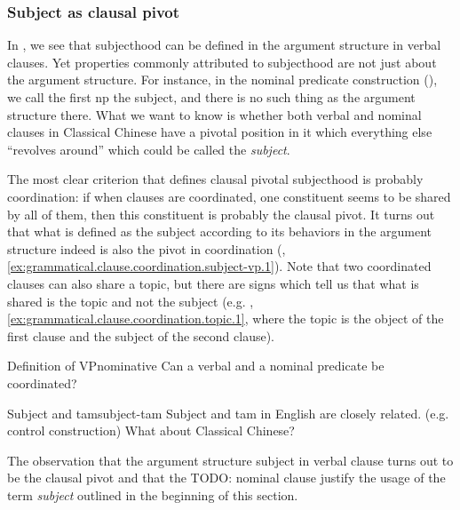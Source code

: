 \documentclass[UTF8, a4paper, oneside, scheme=plain, 12pt]{ctexrep}
\newcommand*{\term}[1]{\emph{#1}}
\begin{document}
\subsubsection{Subject as clausal pivot}\label{sec:grammatical.verbal.subject.clause-pivot}

In ,
we see that subjecthood can be defined in the argument structure in verbal clauses.
Yet properties commonly attributed to subjecthood are not just about the argument structure.
For instance, in the nominal predicate construction (),
we call the first \ac{np} the subject,
and there is no such thing as the argument structure there.
What we want to know is whether both verbal and nominal clauses in Classical Chinese
have a pivotal position in it which everything else ``revolves around''
which could be called the \term{subject}.

The most clear criterion that defines clausal pivotal subjecthood is probably coordination:
if when clauses are coordinated,
one constituent seems to be shared by all of them,
then this constituent is probably the clausal pivot.
It turns out that what is defined as the subject according to its behaviors in the argument structure
indeed is also the pivot in coordination
(,
\ref{ex:grammatical.clause.coordination.subject-vp.1}).
Note that two coordinated clauses can also share a topic,
but there are signs which tell us that what is shared is the topic and not the subject
(e.g. , \ref{ex:grammatical.clause.coordination.topic.1}, where the topic is the object of the first clause and the subject of the second clause).

\begin{todobox}{Definition of VP}{nominative} 
    Can a verbal and a nominal predicate be coordinated? 
\end{todobox}

\begin{todobox}{Subject and \ac{tam}}{subject-tam}
    Subject and \ac{tam} in English are closely related. (e.g. control construction)
    What about Classical Chinese?
\end{todobox}

The observation that the argument structure subject in verbal clause
turns out to be the clausal pivot 
and that the TODO: nominal clause 
justify the usage of the term \term{subject} outlined in the beginning of this section.
\end{document}
